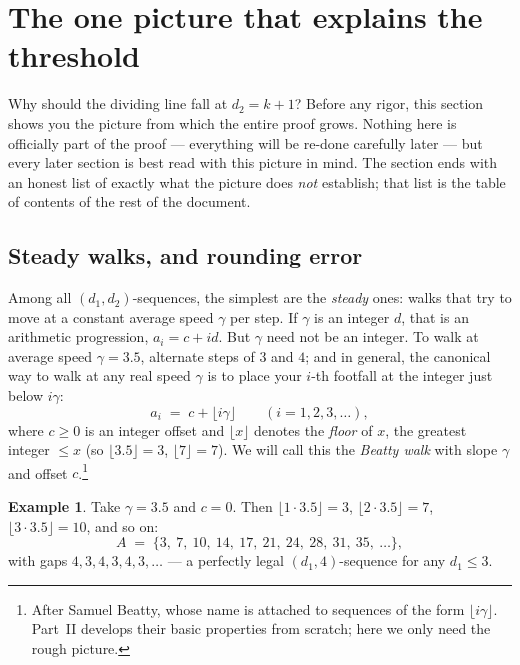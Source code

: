 \documentclass[11pt,reqno]{amsart}
\theoremstyle{plain}
\theoremstyle{definition}
\newtheorem{example}[theorem]{Example}
\theoremstyle{remark}
\begin{document}
\section{The one picture that explains the threshold}\label{sec:picture}

Why should the dividing line fall at $d_2 = k+1$? Before any rigor, this section shows
you the picture from which the entire proof grows. Nothing here is officially part of
the proof --- everything will be re-done carefully later --- but every later section is
best read with this picture in mind. The section ends with an honest list of exactly
what the picture does \emph{not} establish; that list is the table of contents of the
rest of the document.

\subsection{Steady walks, and rounding error}\label{sec:steady}

Among all $(d_1,d_2)$-sequences, the simplest are the \emph{steady} ones: walks that
try to move at a constant average speed $\gamma$ per step. If $\gamma$ is an integer $d$,
that is an arithmetic progression, $a_i = c + i d$. But $\gamma$ need not be an
integer. To walk at average speed $\gamma = 3.5$, alternate steps of $3$ and $4$; and
in general, the canonical way to walk at any real speed $\gamma$ is to place your
$i$-th footfall at the integer just below $i\gamma$:
\[
  a_i \;=\; c + \lfloor i \gamma \rfloor \qquad (i = 1, 2, 3, \dots),
\]
where $c \ge 0$ is an integer offset and $\lfloor x \rfloor$ denotes the \emph{floor}
of $x$, the greatest integer $\le x$ (so $\lfloor 3.5 \rfloor = 3$,
$\lfloor 7 \rfloor = 7$). We will call this the \emph{Beatty walk} with slope $\gamma$
and offset $c$.\footnote{After Samuel Beatty, whose name is attached to sequences of
the form $\lfloor i\gamma \rfloor$. Part~II develops their basic properties from
scratch; here we only need the rough picture.}

\begin{example}\label{ex:beatty35}
Take $\gamma = 3.5$ and $c = 0$. Then $\lfloor 1 \cdot 3.5 \rfloor = 3$,
$\lfloor 2 \cdot 3.5 \rfloor = 7$, $\lfloor 3 \cdot 3.5 \rfloor = 10$, and so on:
\[
  A \;=\; \{3,\ 7,\ 10,\ 14,\ 17,\ 21,\ 24,\ 28,\ 31,\ 35,\ \dots\},
\]
with gaps $4, 3, 4, 3, 4, 3, \dots$ --- a perfectly legal $(d_1, 4)$-sequence for any
$d_1 \le 3$.
\end{example}
\end{document}
